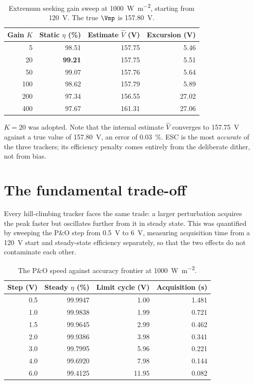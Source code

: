\begin{table}[htbp]
\centering
\caption{Extremum seeking gain sweep at \SI{1000}{\watt\per\square\metre}, starting from \SI{120}{\volt}. The true $\Vmp$ is \SI{157.80}{\volt}.}
\label{tab:escgain}
\begin{tabular}{@{}rrrr@{}}
\toprule
Gain $K$ & Static $\eta$ (\si{\percent}) & Estimate $\hat V$ (\si{\volt}) & Excursion (\si{\volt}) \\
\midrule
5   & 98.51 & 157.75 & 5.46 \\
20  & \textbf{99.21} & 157.75 & 5.51 \\
50  & 99.07 & 157.76 & 5.64 \\
100 & 98.62 & 157.79 & 5.89 \\
200 & 97.34 & 156.55 & 27.02 \\
400 & 97.67 & 161.31 & 27.06 \\
\bottomrule
\end{tabular}
\end{table}

$K = 20$ was adopted. Note that the internal estimate $\hat V$ converges to
\SI{157.75}{\volt} against a true value of \SI{157.80}{\volt}, an error of
\SI{0.03}{\percent}. ESC is the most \emph{accurate} of the three trackers; its
efficiency penalty comes entirely from the deliberate dither, not from bias.

\section{The fundamental trade-off}
\label{sec:tradeoff}

Every hill-climbing tracker faces the same trade: a larger perturbation acquires
the peak faster but oscillates further from it in steady state. This was
quantified by sweeping the P\&O step from \SI{0.5}{\volt} to \SI{6}{\volt},
measuring acquisition time from a \SI{120}{\volt} start and steady-state
efficiency separately, so that the two effects do not contaminate each other.

\begin{table}[htbp]
\centering
\caption{The P\&O speed against accuracy frontier at \SI{1000}{\watt\per\square\metre}.}
\label{tab:tradeoff}
\begin{tabular}{@{}rrrr@{}}
\toprule
Step (\si{\volt}) & Steady $\eta$ (\si{\percent}) & Limit cycle (\si{\volt}) & Acquisition (\si{\second}) \\
\midrule
0.5 & 99.9947 & 1.00  & 1.481 \\
1.0 & 99.9838 & 1.99  & 0.721 \\
1.5 & 99.9645 & 2.99  & 0.462 \\
2.0 & 99.9386 & 3.98  & 0.341 \\
3.0 & 99.7995 & 5.96  & 0.221 \\
4.0 & 99.6920 & 7.98  & 0.144 \\
6.0 & 99.4125 & 11.95 & 0.082 \\
\bottomrule
\end{tabular}
\end{table}

